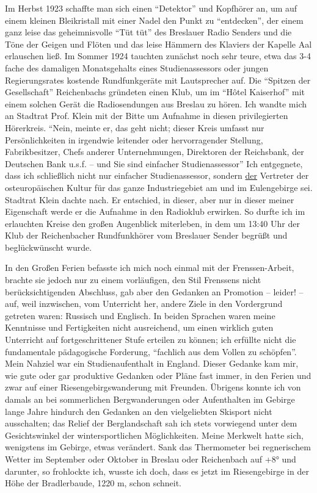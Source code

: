 Im Herbst 1923 schaffte man sich einen \enquote{Detektor} und Kopfhörer an, um auf einem kleinen Bleikristall mit einer Nadel den Punkt zu \enquote{entdecken}, der einem ganz leise das geheimnisvolle \enquote{Tüt tüt} des Breslauer Radio Senders und die Töne der Geigen und Flöten und das leise Hämmern des Klaviers der Kapelle Aal erlauschen ließ. Im Sommer 1924 tauchten zunächst noch sehr teure, etwa das 3-4 fache des damaligen Monatsgehalts eines Studienassessors oder jungen Regierungsrates kostende Rundfunkgeräte mit Lautsprecher auf. Die \enquote{Spitzen der Gesellschaft} Reichenbachs gründeten einen Klub, um im \enquote{Hôtel Kaiserhof} mit einem solchen Gerät die Radiosendungen aus Breslau zu hören. Ich wandte mich an Stadtrat Prof. Klein mit der Bitte um Aufnahme in diesen privilegierten Hörerkreis. \enquote{Nein, meinte er, das geht nicht; dieser Kreis umfasst nur Persönlichkeiten in irgendwie leitender oder hervorragender Stellung, Fabrikbesitzer, Chefs anderer Unternehmungen, Direktoren der Reichsbank, der Deutschen Bank u.s.f. -- und Sie sind einfacher Studienassessor} Ich entgegnete, dass ich schließlich nicht nur einfacher Studienassessor, sondern \underline{der} Vertreter der osteuropäischen Kultur für das ganze Industriegebiet am und im Eulengebirge sei. Stadtrat Klein dachte nach. Er entschied, in dieser, aber nur in dieser meiner Eigenschaft werde er die Aufnahme in den Radioklub erwirken. So durfte ich im erlauchten Kreise den großen Augenblick miterleben, in dem um 13:40 Uhr der Klub der Reichenbacher Rundfunkhörer vom Breslauer Sender begrüßt und beglückwünscht wurde.

In den Großen Ferien befasste ich mich noch einmal mit der Frenssen-Arbeit, brachte sie jedoch nur zu einem vorläufigen, den Stil Frenssens nicht berücksichtigenden Abschluss, gab aber den Gedanken an Promotion -- leider! -- auf, weil inzwischen, vom Unterricht her, andere Ziele in den Vordergrund getreten waren: Russisch und Englisch. In beiden Sprachen waren meine Kenntnisse und Fertigkeiten nicht ausreichend, um einen wirklich guten Unterricht auf fortgeschrittener Stufe erteilen zu können; ich erfüllte nicht die fundamentale pädagogische Forderung, \enquote{fachlich aus dem Vollen zu schöpfen}. Mein Nahziel war ein Studienaufenthalt in England. Dieser Gedanke kam mir, wie gute oder gar produktive Gedanken oder Pläne fast immer, in den Ferien und zwar auf einer Riesengebirgswanderung mit Freunden. Übrigens konnte ich von damals an bei sommerlichen Bergwanderungen oder Aufenthalten im Gebirge lange Jahre hindurch den Gedanken an den vielgeliebten Skisport nicht ausschalten; das Relief der Berg\-land\-schaft sah ich stets vorwiegend unter dem Gesichtswinkel der wintersportlichen Möglichkeiten. Meine Merkwelt hatte sich, wenigstens im Gebirge, etwas verändert. Sank das Thermometer bei regnerischem Wetter im September oder Oktober in Breslau oder Reichenbach auf +8° und darunter, so frohlockte ich, wusste ich doch, dass es jetzt im Riesengebirge in der Höhe der Bradlerbaude, 1220 m, schon schneit.

